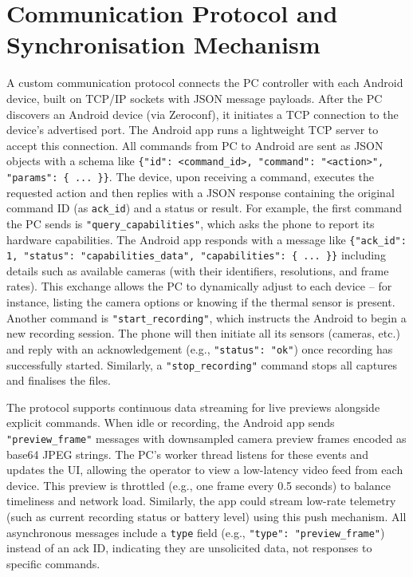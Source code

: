 \section{Communication Protocol and Synchronisation Mechanism}\label{sec:4-4}
A custom communication protocol connects the PC controller with each Android device, built on TCP/IP sockets \cite{ref21} with JSON message payloads. After the PC discovers an Android device (via Zeroconf), it initiates a TCP connection to the device's advertised port. The Android app runs a lightweight TCP server to accept this connection. All commands from PC to Android are sent as JSON objects with a schema like \texttt{\{"id": <command\_id>, "command": "<action>", "params": \{ ... \}\}}. The device, upon receiving a command, executes the requested action and then replies with a JSON response containing the original command ID (as \texttt{ack\_id}) and a status or result. For example, the first command the PC sends is \texttt{"query\_capabilities"}, which asks the phone to report its hardware capabilities. The Android app responds with a message like \texttt{\{"ack\_id": 1, "status": "capabilities\_data", "capabilities": \{ ... \}\}} including details such as available cameras (with their identifiers, resolutions, and frame rates). This exchange allows the PC to dynamically adjust to each device -- for instance, listing the camera options or knowing if the thermal sensor is present. Another command is \texttt{"start\_recording"}, which instructs the Android to begin a new recording session. The phone will then initiate all its sensors (cameras, etc.) and reply with an acknowledgement (e.g., \texttt{"status": "ok"}) once recording has successfully started. Similarly, a \texttt{"stop\_recording"} command stops all captures and finalises the files.

The protocol supports continuous data streaming for live previews alongside explicit commands. When idle or recording, the Android app sends \texttt{"preview\_frame"} messages with downsampled camera preview frames encoded as base64 JPEG strings. The PC's worker thread listens for these events and updates the UI, allowing the operator to view a low-latency video feed from each device. This preview is throttled (e.g., one frame every 0.5 seconds) to balance timeliness and network load. Similarly, the app could stream low-rate telemetry (such as current recording status or battery level) using this push mechanism. All asynchronous messages include a \texttt{type} field (e.g., \texttt{"type": "preview\_frame"}) instead of an ack ID, indicating they are unsolicited data, not responses to specific commands.

